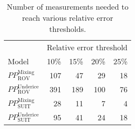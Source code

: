 \begin{table}[ht]
\centering
\begin{tabular}{lrrrr}
  \toprule
  & \multicolumn{4}{c}{Relative error threshold} \\
 Model & 10\% & 15\% & 20\% & 25\% \\
 \midrule
$PP^{\mathrm{Mixing}}_{\mathrm{ROV}}$ & 107 & 47 & 29 & 18 \\ 
  $PP^{\mathrm{Underice}}_{\mathrm{ROV}}$ & 391 & 189 & 100 & 76 \\ 
  $PP^{\mathrm{Mixing}}_{\mathrm{SUIT}}$ & 28 & 11 & 7 & 4 \\ 
  $PP^{\mathrm{Underice}}_{\mathrm{SUIT}}$ & 95 & 41 & 24 & 18 \\ 
   \bottomrule
\end{tabular}
\caption{Number of measurements needed to reach various relative error thresholds.} 
\end{table}
